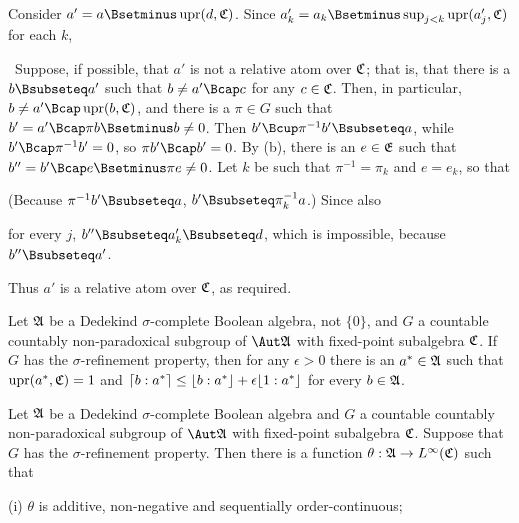 {Consider $a'=a\Bsetminus\upr(d,\frak C)$.   Since
$a'_k=a_k\Bsetminus\sup_{j<k}\upr(a'_j,\frak C)$ for each $k$,


\noindent\Quer\ Suppose, if possible, that $a'$ is not a relative atom
over $\frak C$;  that is, that there is a $b\Bsubseteq a'$ such that
$b\ne a'\Bcap c$ for any $c\in\frak C$.   Then, in particular,
$b\ne a'\Bcap\upr(b,\frak C)$, and there is a $\pi\in G$ such that
$b'=a'\Bcap\pi b\Bsetminus b\ne 0$.   Then
$b'\Bcup\pi^{-1}b'\Bsubseteq a$, while $b'\Bcap\pi^{-1}b'=0$,
so $\pi b'\Bcap b'=0$.   By (b), there
is an $e\in\frak E$ such that $b''=b'\Bcap e\Bsetminus\pi e\ne 0$.   Let
$k$ be such that $\pi^{-1}=\pi_k$ and $e=e_k$, so that


\noindent(Because $\pi^{-1}b'\Bsubseteq a$, $b'\Bsubseteq\pi_k^{-1}a$.)
Since also


\noindent for every $j$, $b''\Bsubseteq a'_k\Bsubseteq d$, which is
impossible, because $b''\Bsubseteq a'$.\ \Bang

Thus $a'$ is a relative atom over $\frak C$, as required.
}%


 Let $\frak A$ be a Dedekind $\sigma$-complete
Boolean algebra, not $\{0\}$, and $G$ a countable countably
non-paradoxical subgroup of $\Aut\frak A$ with fixed-point subalgebra
$\frak C$.   If $G$ has the $\sigma$-refinement property, then for any
$\epsilon>0$ there is an $a^*\in\frak A$ such that $\mathop{\text{upr}}(a^*,\frak C)=1$
and $\lceil b:a^*\rceil\le\lfloor b:a^*\rfloor+\epsilon\lfloor1:a^*\rfloor$ for every
$b\in\frak A$.


  Let $\frak A$ be a
Dedekind $\sigma$-complete Boolean algebra and $G$ a countable countably
non-paradoxical subgroup of $\Aut\frak A$ with
fixed-point subalgebra $\frak C$.   Suppose that $G$ has the
$\sigma$-refinement
property.   Then there is a function
$\theta:\frak A\to L^{\infty}(\frak C)$ such that

(i) $\theta$ is additive, non-negative and sequentially
order-continuous;

